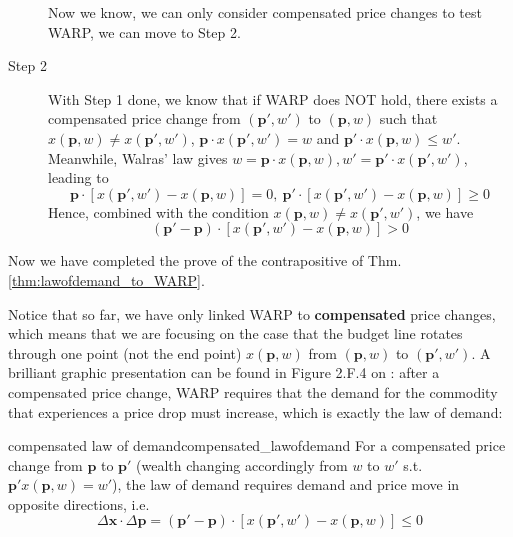 \begin{description}
    Now we know, we can only consider compensated price changes to test WARP, we can move to Step 2.
    \item[Step 2] With Step 1 done, we know that if WARP does NOT hold, there exists a compensated price change from $(\mathbf{p}',w')$ to $(\mathbf{p},w)$ such that $ x(\mathbf{p},w)\neq  x(\mathbf{p}',w')$, $\mathbf{p}\cdot  x(\mathbf{p}',w')=w$ and $\mathbf{p'}\cdot  x(\mathbf{p},w)\leq w'$. 
    Meanwhile, Walras' law gives $w= \mathbf{p}\cdot x(\mathbf{p},w),w'=\mathbf{p}'\cdot x(\mathbf{p}',w')$, leading to 
    $$\mathbf{p}\cdot\left[ x(\mathbf{p}',w')- x(\mathbf{p},w)\right]=0,\ \mathbf{p}'\cdot\left[ x(\mathbf{p}',w')- x(\mathbf{p},w)\right]\geq 0$$
    Hence, combined with the condition $ x(\mathbf{p},w)\neq  x(\mathbf{p}',w')$, we have
    $$(\mathbf{p}'-\mathbf{p})\cdot\left[ x(\mathbf{p}',w')- x(\mathbf{p},w)\right]> 0$$ 
\end{description}
Now we have completed the prove of the contrapositive of Thm.\ref{thm:lawofdemand_to_WARP}.

Notice that so far, we have only linked WARP to \textbf{compensated} price changes, which means that we are focusing on the case that the budget line rotates through one point (not the end point) $ x(\mathbf{p},w)$ from $(\mathbf{p},w)$ to $(\mathbf{p}',w')$. 
A brilliant graphic presentation can be found in Figure 2.F.4 on \citet[Page 33]{mas1995microeconomic}: after a compensated price change, WARP requires that the demand for the commodity that experiences a price drop must increase, which is exactly the law of demand:
\begin{theorem}{compensated law of demand}{compensated_lawofdemand}
    For a compensated price change from $\mathbf{p}$ to $\mathbf{p}'$ (wealth changing accordingly from $w$ to $w'$ s.t. $\mathbf{p}' x(\mathbf{p},w)=w'$), the law of demand requires demand and price move in opposite directions, i.e.
    $$\Delta \mathbf{x}\cdot \Delta \mathbf{p} = (\mathbf{p}'-\mathbf{p})\cdot [ x(\mathbf{p}',w')- x(\mathbf{p},w)]\leq 0$$
\end{theorem}

